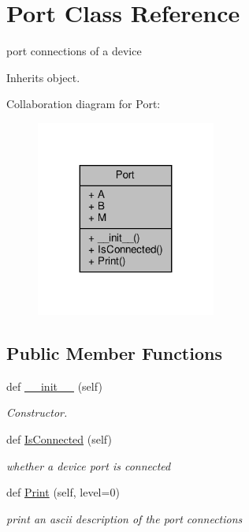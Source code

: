 \hypertarget{classSignalIntegrity_1_1SystemDescriptions_1_1Port_1_1Port}{}\section{Port Class Reference}
\label{classSignalIntegrity_1_1SystemDescriptions_1_1Port_1_1Port}


port connections of a device  




Inherits object.



Collaboration diagram for Port\+:
\nopagebreak
\begin{figure}[H]
\begin{center}
\leavevmode
\includegraphics[width=167pt]{classSignalIntegrity_1_1SystemDescriptions_1_1Port_1_1Port__coll__graph}
\end{center}
\end{figure}
\subsection*{Public Member Functions}
\begin{DoxyCompactItemize}
\item 
\mbox{\label{classSignalIntegrity_1_1SystemDescriptions_1_1Port_1_1Port_ae64f0875afe3067b97ba370b354b9213}} 
def \hyperlink{classSignalIntegrity_1_1SystemDescriptions_1_1Port_1_1Port_ae64f0875afe3067b97ba370b354b9213}{\+\_\+\+\_\+init\+\_\+\+\_\+} (self)
\begin{DoxyCompactList}\small\item\em Constructor. \end{DoxyCompactList}\item 
def \hyperlink{classSignalIntegrity_1_1SystemDescriptions_1_1Port_1_1Port_a38c0724582a690c5fcc37a259ae6f97e}{Is\+Connected} (self)
\begin{DoxyCompactList}\small\item\em whether a device port is connected \end{DoxyCompactList}\item 
def \hyperlink{classSignalIntegrity_1_1SystemDescriptions_1_1Port_1_1Port_a891ce4dff358dfe4f73c3c0e269bcffd}{Print} (self, level=0)
\begin{DoxyCompactList}\small\item\em print an ascii description of the port connections \end{DoxyCompactList}\end{DoxyCompactItemize}


